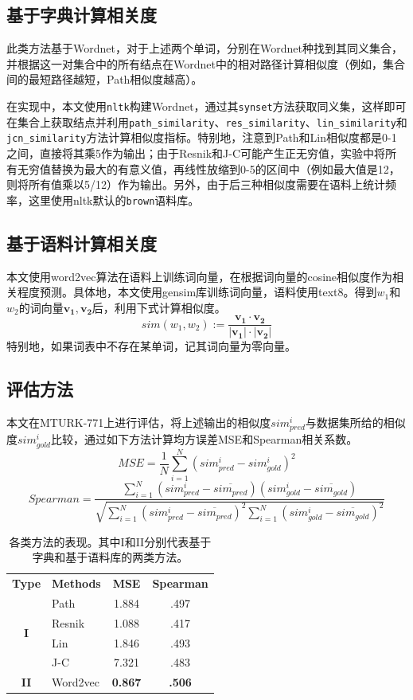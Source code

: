 \documentclass{article}
\begin{document}
\subsection{基于字典计算相关度}
此类方法基于Wordnet，对于上述两个单词，分别在Wordnet种找到其同义集合，并根据这一对集合中的所有结点在Wordnet中的相对路径计算相似度（例如，集合间的最短路径越短，Path相似度越高）。

在实现中，本文使用\texttt{nltk}构建Wordnet，通过其\texttt{synset}方法获取同义集，这样即可在集合上获取结点并利用\texttt{path\_similarity}、\texttt{res\_similarity}、\texttt{lin\_similarity}和\texttt{jcn\_similarity}方法计算相似度指标。特别地，注意到Path和Lin相似度都是0-1之间，直接将其乘5作为输出；由于Resnik和J-C可能产生正无穷值，实验中将所有无穷值替换为最大的有意义值，再线性放缩到0-5的区间中（例如最大值是12，则将所有值乘以5/12）作为输出。另外，由于后三种相似度需要在语料上统计频率，这里使用nltk默认的\texttt{brown}语料库。

\subsection{基于语料计算相关度}
本文使用word2vec算法在语料上训练词向量，在根据词向量的cosine相似度作为相关程度预测。具体地，本文使用gensim库训练词向量，语料使用text8。得到$w_1$和$w_2$的词向量$\mathbf{v_1}, \mathbf{v_2}$后，利用下式计算相似度。
\[ sim(w_1, w_2) := \frac{\mathbf{v_1}\cdot \mathbf{v_2}}{|\mathbf{v_1}|\cdot |\mathbf{v_2}|} \]
特别地，如果词表中不存在某单词，记其词向量为零向量。

\subsection{评估方法}
本文在MTURK-771上进行评估，将上述输出的相似度$sim_{pred}^i$与数据集所给的相似度$sim_{gold}^i$比较，通过如下方法计算均方误差MSE和Spearman相关系数。
\[ MSE = \frac{1}{N} \sum\limits_{i=1}^{N} {(sim_{pred}^i-sim_{gold}^i)}^2 \]
\[ Spearman = \frac{\sum\limits_{i=1}^N (sim_{pred}^i - \overline{sim_{pred}})(sim_{gold}^i - \overline{sim_{gold}})}{\sqrt{\sum\limits_{i=1}^N {(sim_{pred}^i - \overline{sim_{pred}})}^2  \sum\limits_{i=1}^N {(sim_{gold}^i - \overline{sim_{gold}})}^2}} \]


\begin{table}[h]
  \centering
  \begin{tabular}{c l c c}
    \toprule
    \bfseries Type & \bfseries Methods & \bfseries MSE & \bfseries Spearman\\
    \cmidrule(lr){1-4}
    \multirow{4}{*}{\bfseries I} &
    Path  & 1.884 & .497 \\
    & Resnik & 1.088 & .417 \\
    & Lin & 1.846 & .493 \\
    & J-C & 7.321 & .483 \\
    \cmidrule(lr){1-4}
    \multirow{1}{*}{\bfseries II} &
    Word2vec & \bfseries 0.867 & \bfseries .506 \\
    \bottomrule
\end{tabular}
  \caption{各类方法的表现。其中I和II分别代表基于字典和基于语料库的两类方法。}
  \label{tab:overall_eval}
\end{table}
\end{document}
